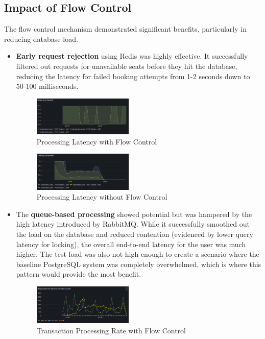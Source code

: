 \subsection{Impact of Flow Control}
The flow control mechanism demonstrated significant benefits, particularly in reducing database load.
\begin{itemize}
    \item \textbf{Early request rejection} using Redis was highly effective. It successfully filtered out requests for unavailable seats before they hit the database, reducing the latency for failed booking attempts from 1-2 seconds down to 50-100 milliseconds.
          \begin{figure}[htbp]
              \centering
              \includegraphics[width=0.45\textwidth]{resources/chapter-4/latency-fc-pg-stress-0.png}
              \caption{Processing Latency with Flow Control}
              \label{fig:latency-fc}
          \end{figure}

          \begin{figure}[htbp]
              \centering
              \includegraphics[width=0.45\textwidth]{resources/chapter-4/latency-nofc-pg-stress-0.png}
              \caption{Processing Latency without Flow Control}
              \label{fig:latency-nofc}
          \end{figure}
    \item The \textbf{queue-based processing} showed potential but was hampered by the high latency introduced by RabbitMQ. While it successfully smoothed out the load on the database and reduced contention (evidenced by lower query latency for locking), the overall end-to-end latency for the user was much higher. The test load was also not high enough to create a scenario where the baseline PostgreSQL system was completely overwhelmed, which is where this pattern would provide the most benefit.
          \begin{figure}[h!]
              \centering
              \includegraphics[width=0.45\textwidth]{resources/chapter-4/rps-fc-pg-stress-0.png}
              \caption{Transaction Processing Rate with Flow Control}
              \label{fig:rps-fc-pg-stress-0}
          \end{figure}


\end{itemize}
